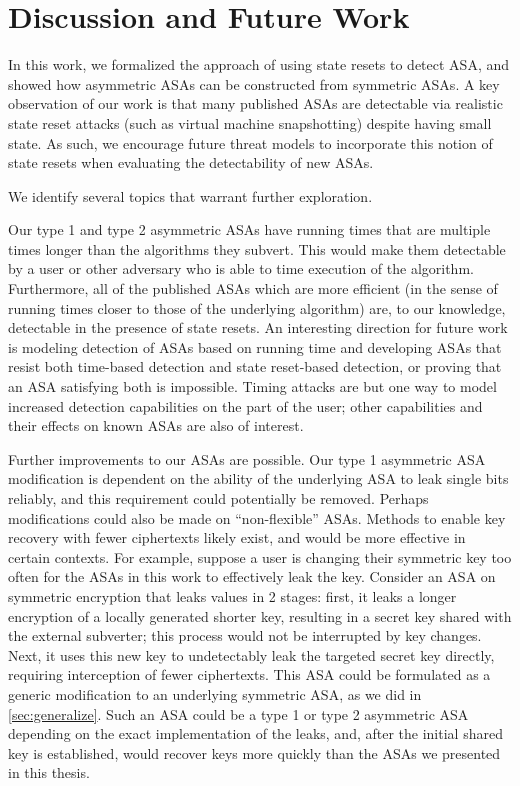 \chapter{Discussion and Future Work}
In this work, we formalized the approach of using state resets to detect ASA, and showed how asymmetric ASAs can be constructed from symmetric ASAs. A key observation of our work is that many published ASAs are detectable via realistic state reset attacks (such as virtual machine snapshotting) despite having small state.  As such, we encourage future threat models to incorporate this notion of state resets when evaluating the detectability of new ASAs.

We identify several topics that warrant further exploration.

Our type 1 and type 2 asymmetric ASAs have running times that are multiple times longer than the algorithms they subvert. This would make them detectable by a user or other adversary who is able to time execution of the algorithm. Furthermore, all of the published ASAs which are more efficient (in the sense of running times closer to those of the underlying algorithm) are, to our knowledge, detectable in the presence of state resets. An interesting direction for future work is modeling detection of ASAs based on running time and developing ASAs that resist both time-based detection and state reset-based detection, or proving that an ASA satisfying both is impossible. Timing attacks are but one way to model increased detection capabilities on the part of the user; other capabilities and their effects on known ASAs are also of interest.

Further improvements to our ASAs are possible. Our type 1 asymmetric ASA modification is dependent on the ability of the underlying ASA to leak single bits reliably, and this requirement could potentially be removed. Perhaps modifications could also be made on ``non-flexible'' ASAs. Methods to enable key recovery with fewer ciphertexts likely exist, and would be more effective in certain contexts. For example, suppose a user is changing their symmetric key too often for the ASAs in this work to effectively leak the key. Consider an ASA on symmetric encryption that leaks values in 2 stages: first, it leaks a longer encryption of a locally generated shorter key, resulting in a secret key shared with the external subverter; this process would not be interrupted by key changes. Next, it uses this new key to undetectably leak the targeted secret key directly, requiring interception of fewer ciphertexts. This ASA could be formulated as a generic modification to an underlying symmetric ASA, as we did in \autoref{sec:generalize}. Such an ASA could be a type 1 or type 2 asymmetric ASA depending on the exact implementation of the leaks, and, after the initial shared key is established, would recover keys more quickly than the ASAs we presented in this thesis.

